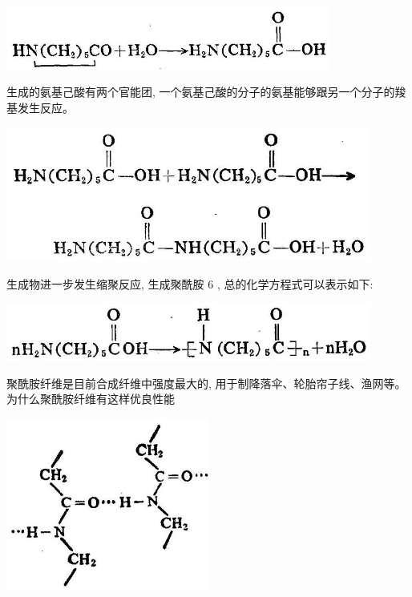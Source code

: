 \documentclass[10pt]{article}
\begin{document}
\begin{center}
\includegraphics[max width=0.8\textwidth]{images/01912d16-be99-77bb-9535-4f3ed8d9946f_194_592497.jpg}
\end{center}

生成的氨基己酸有两个官能团, 一个氨基己酸的分子的氨基能够跟另一个分子的羧基发生反应。

\begin{center}
\includegraphics[max width=0.9\textwidth]{images/01912d16-be99-77bb-9535-4f3ed8d9946f_195_510018.jpg}
\end{center}

生成物进一步发生缩聚反应, 生成聚酰胺 6 , 总的化学方程式可以表示如下:

\begin{center}
\includegraphics[max width=0.9\textwidth]{images/01912d16-be99-77bb-9535-4f3ed8d9946f_195_855628.jpg}
\end{center}

聚酰胺纤维是目前合成纤维中强度最大的, 用于制降落伞、轮胎帘子线、渔网等。为什么聚酰胺纤维有这样优良性能

\begin{center}
\includegraphics[max width=0.5\textwidth]{images/01912d16-be99-77bb-9535-4f3ed8d9946f_195_860547.jpg}
\end{center}
\end{document}
